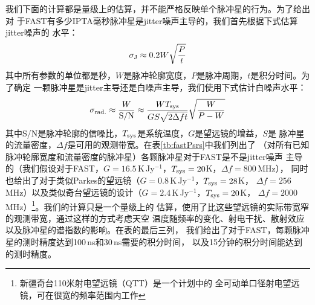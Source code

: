 我们下面的计算都是量级上的估算，并不能严格反映单个脉冲星的行为。为了给出对
于FAST有多少IPTA毫秒脉冲星是jitter噪声主导的，我们首先根据下式估算jitter噪声的
水平\supercite{Shannon12}：
\begin{equation}\label{eqn:jitter}
\sigma_{\rm J} \approx 0.2 W \sqrt{\frac{P}{t}}
\end{equation}
其中所有参数的单位都是秒，$W$是脉冲轮廓宽度，$P$是脉冲周期，$t$是积分时间。为了确定
一颗脉冲星是jitter主导还是白噪声主导，我们使用下式估计白噪声水平：
\begin{equation}
\sigma_{\rm rad.} \approx \frac{W}{\rm S/N} \approx \frac{W T_{\rm sys}}{GS\sqrt{2\Delta ft}}\sqrt{\frac{W}{P-W}}
\end{equation}
其中S/N是脉冲轮廓的信噪比，$T_{\rm sys}$是系统温度，$G$是望远镜的增益，$S$是
脉冲星的流量密度，$\Delta f$是可用的观测带宽。在表\ref{tb:fastPsrs}中我们列出了
（对所有已知脉冲轮廓宽度和流量密度的脉冲星）各颗脉冲星对于FAST是不是jitter噪声
主导的（我们假设对于FAST，$G=16.5$\,K\,Jy$^{-1}$，$T_{\rm sys} = 20$K，$\Delta f = 800$\,MHz），
同时也给出了对于类似Parkes的望远镜（$G=0.8$\,K\,Jy$^{-1}$，$T_{\rm sys} = 28$K，
$\Delta f = 256$\,MHz）以及类似奇台望远镜的设计（$G=2.4$\,K\,Jy$^{-1}$，$T_{\rm sys} = 20$K，
$\Delta f = 2000$\,MHz）\footnote{新疆奇台110米射电望远镜（QTT）是一个计划中的
全可动单口径射电望远镜，可在很宽的频率范围内工作}。我们的计算只是一个量级上的
估算，使用了比这些望远镜的实际带宽窄的观测带宽，通过这样的方式考虑天空
温度随频率的变化、射电干扰、散射效应以及脉冲星的谱指数的影响。在表的最后三列，
我们给出了对于FAST，每颗脉冲星的测时精度达到100\,ns和30\,ns需要的积分时间，
以及15分钟的积分时间能达到的测时精度。

